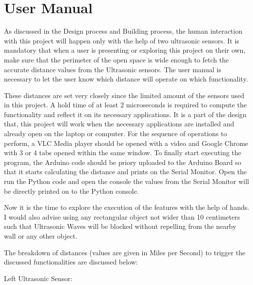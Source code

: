 \documentclass[12pt,journal]{IEEEtran}
\begin{document}
\section{User Manual}
\par As discussed in the Design process and Building process, the human interaction with this project will happen only with the help of two ultrasonic sensors. It is mandatory that when a user is presenting or exploring this project on their own, make sure that the perimeter of the open space is wide enough to fetch the accurate distance values from the Ultrasonic sensors. The user manual is necessary to let the user know which distance will operate on which functionality.
\par These distances are set very closely since the limited amount of the sensors used in this project. A hold time of at least 2 microseconds is required to compute the functionality and reflect it on its necessary applications. It is a part of the design that, this project will work when the necessary applications are installed and already open on the laptop or computer. For the sequence of operations to perform, a VLC Media player should be opened with a video and Google Chrome with 3 or 4 tabs opened within the same window. To finally start executing the program, the Arduino code should be priory uploaded to the Arduino Board so that it starts calculating the distance and prints on the Serial Monitor. Open the run the Python code and open the console the values from the Serial Monitor will be directly printed on to the Python console.
\par Now it is the time to explore the execution of the features with the help of hands. I would also advise using any rectangular object not wider than 10 centimeters such that Ultrasonic Waves will be blocked without repelling from the nearby wall or any other object.
\par The breakdown of distances (values are given in Miles per Second) to trigger the discussed functionalities are discussed below:
\par Left Ultrasonic Sensor:
 \bigskip
\end{document}
